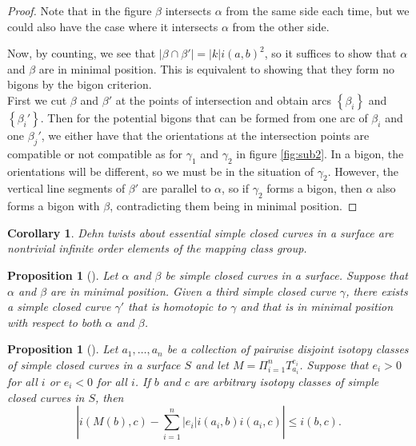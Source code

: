 \documentclass[reqno]{amsart}
\newtheorem{proposition}[theorem]{Proposition}
\newtheorem{corollary}[theorem]{Corollary}
\theoremstyle{definition}
\theoremstyle{remark}
\begin{document}
\begin{proof}
    Note that in the figure $\beta$ intersects $\alpha$ from the
    same side each time, but we could also have the
    case where it intersects $\alpha$ from the other side.

    Now, by counting, we see that
    $\left| \beta \cap \beta' \right| 
    = \left| k \right| i \left( a,b \right)^2$, so
    it suffices to show that $\alpha$ and $\beta$ are in
    minimal position. This is equivalent to showing that
    they form no bigons by the bigon criterion.\\
    
    First we cut $\beta$ and $\beta'$ at the
    points of intersection and obtain arcs
    $\left\{ \beta_i \right\} $ and
    $\left\{ \beta_i' \right\} $.
    Then for the potential bigons that can be formed
    from one arc of $\beta_i$ and one $\beta_j'$, we
    either have that the orientations at the intersection points
    are compatible or not compatible as for
    $\gamma_1$ and $\gamma_2$ in figure \ref{fig:sub2}.
    In a bigon, the orientations will be different, so
    we must be in the situation of $\gamma_2$. However, the
    vertical line segments of $\beta'$ are parallel to $\alpha$,
    so if $\gamma_2$ forms a bigon, then $\alpha$ also
    forms a bigon with $\beta$, contradicting
    them being in minimal position.
\end{proof}


\begin{corollary}
    Dehn twists about essential simple closed curves
    in a surface are nontrivial infinite order elements
    of the mapping class group.
\end{corollary}

\begin{proposition}[]
    Let $\alpha$ and $\beta$ be simple closed curves in a surface.
    Suppose that $\alpha$ and $\beta$ are in minimal position.
    Given a third simple closed curve $\gamma$, there
    exists a simple closed curve $\gamma'$ that is
    homotopic to $\gamma$ and that is in minimal position
    with respect to both $\alpha$ and $\beta$.
\end{proposition}

\begin{proposition}[]
    Let $a_1 ,\ldots, a_n$ be a collection of pairwise
    disjoint isotopy classes of simple closed curves in
    a surface $S$ and let $M = \Pi_{i=1}^{n}T_{a_i}^{e_i}$.
    Suppose that $e_i > 0$ for all $i$ or $e_i < 0$ for
    all $i$. If $b$ and $c$ are arbitrary isotopy
    classes of simple closed curves in $S$, then
    \[
    \left| i \left( M(b), c \right) -
    \sum_{i=1}^{n} \left| e_i \right| i(a_i,b)
    i(a_i,c) \right| \le i(b,c).
    \] 
\end{proposition}
\end{document}
